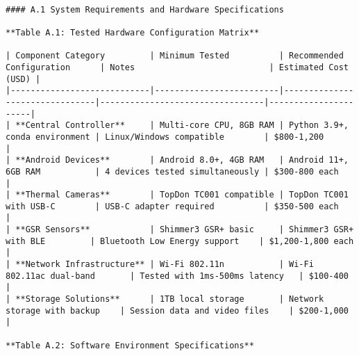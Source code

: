 \documentclass[12pt,a4paper]{report}
\begin{document}
\begin{verbatim}

#### A.1 System Requirements and Hardware Specifications

**Table A.1: Tested Hardware Configuration Matrix**

| Component Category         | Minimum Tested          | Recommended Configuration      | Notes                           | Estimated Cost (USD) |
|----------------------------|-------------------------|--------------------------------|---------------------------------|----------------------|
| **Central Controller**     | Multi-core CPU, 8GB RAM | Python 3.9+, conda environment | Linux/Windows compatible        | $800-1,200           |
| **Android Devices**        | Android 8.0+, 4GB RAM   | Android 11+, 6GB RAM           | 4 devices tested simultaneously | $300-800 each        |
| **Thermal Cameras**        | TopDon TC001 compatible | TopDon TC001 with USB-C        | USB-C adapter required          | $350-500 each        |
| **GSR Sensors**            | Shimmer3 GSR+ basic     | Shimmer3 GSR+ with BLE         | Bluetooth Low Energy support    | $1,200-1,800 each    |
| **Network Infrastructure** | Wi-Fi 802.11n           | Wi-Fi 802.11ac dual-band       | Tested with 1ms-500ms latency   | $100-400             |
| **Storage Solutions**      | 1TB local storage       | Network storage with backup    | Session data and video files    | $200-1,000           |

**Table A.2: Software Environment Specifications**


\end{verbatim}
\end{document}
